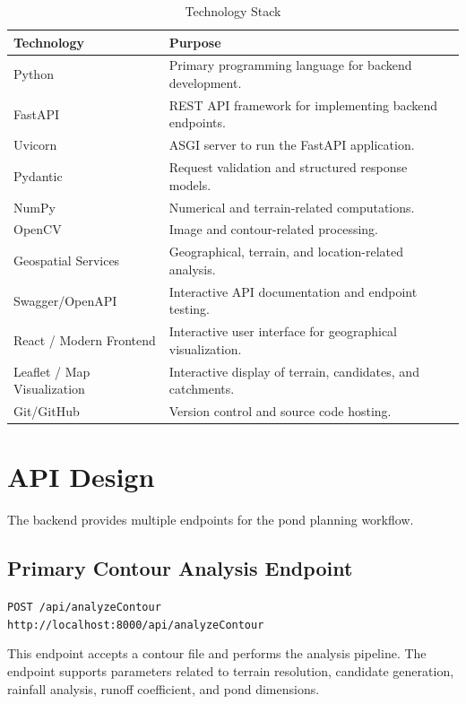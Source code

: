 \documentclass[12pt,a4paper]{article}
\begin{document}
\begin{table}[H]
\centering
\caption{Technology Stack}
\begin{tabular}{p{4cm} p{9cm}}
\toprule
\textbf{Technology} & \textbf{Purpose} \\
\midrule
Python & Primary programming language for backend development. \\
FastAPI & REST API framework for implementing backend endpoints. \\
Uvicorn & ASGI server to run the FastAPI application. \\
Pydantic & Request validation and structured response models. \\
NumPy & Numerical and terrain-related computations. \\
OpenCV & Image and contour-related processing. \\
Geospatial Services & Geographical, terrain, and location-related analysis. \\
Swagger/OpenAPI & Interactive API documentation and endpoint testing. \\
React / Modern Frontend & Interactive user interface for geographical visualization. \\
Leaflet / Map Visualization & Interactive display of terrain, candidates, and catchments. \\
Git/GitHub & Version control and source code hosting. \\
\bottomrule
\end{tabular}
\end{table}

\section{API Design}

The backend provides multiple endpoints for the pond planning workflow.

\subsection{Primary Contour Analysis Endpoint}

\begin{center}
\texttt{POST /api/analyzeContour} \\
\texttt{http://localhost:8000/api/analyzeContour}
\end{center}

This endpoint accepts a contour file and performs the analysis pipeline. The endpoint
supports parameters related to terrain resolution, candidate generation, rainfall analysis,
runoff coefficient, and pond dimensions.
\end{document}
